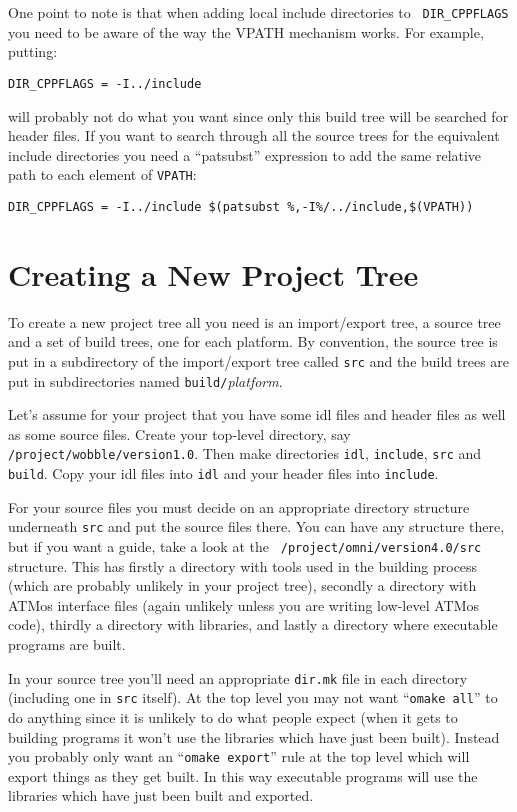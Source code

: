 \documentclass[11pt]{article}
\begin{document}
One point to note is that when adding local include directories to {\tt
DIR\_CPPFLAGS} you need to be aware of the way the VPATH mechanism works.  For
example, putting:

\begin{verbatim}
DIR_CPPFLAGS = -I../include
\end{verbatim}

will probably not do what you want since only this build tree will be searched
for header files.  If you want to search through all the source trees for the
equivalent include directories you need a ``patsubst'' expression to add the
same relative path to each element of {\tt VPATH}:

\begin{verbatim}
DIR_CPPFLAGS = -I../include $(patsubst %,-I%/../include,$(VPATH))
\end{verbatim}


\section{Creating a New Project Tree}

To create a new project tree all you need is an import/export tree, a source
tree and a set of build trees, one for each platform.  By convention, the
source tree is put in a subdirectory of the import/export tree called {\tt src}
and the build trees are put in subdirectories named {\tt build/}{\it platform}.

Let's assume for your project that you have some idl files and header files as
well as some source files.  Create your top-level directory, say {\tt
/project/wobble/version1.0}.  Then make directories {\tt idl}, {\tt include},
{\tt src} and {\tt build}.  Copy your idl files into {\tt idl} and your header
files into {\tt include}.

For your source files you must decide on an appropriate directory structure
underneath {\tt src} and put the source files there.  You can have any
structure there, but if you want a guide, take a look at the {\tt
/project/omni/version4.0/src} structure.  This has firstly a directory with
tools used in the building process (which are probably unlikely in your project
tree), secondly a directory with ATMos interface files (again unlikely unless
you are writing low-level ATMos code), thirdly a directory with libraries, and
lastly a directory where executable programs are built.

In your source tree you'll need an appropriate {\tt dir.mk} file in each
directory (including one in {\tt src} itself).  At the top level you may not
want ``{\tt omake all}'' to do anything since it is unlikely to do what people
expect (when it gets to building programs it won't use the libraries which have
just been built).  Instead you probably only want an ``{\tt omake export}''
rule at the top level which will export things as they get built.  In this way
executable programs will use the libraries which have just been built and
exported.
\end{document}
